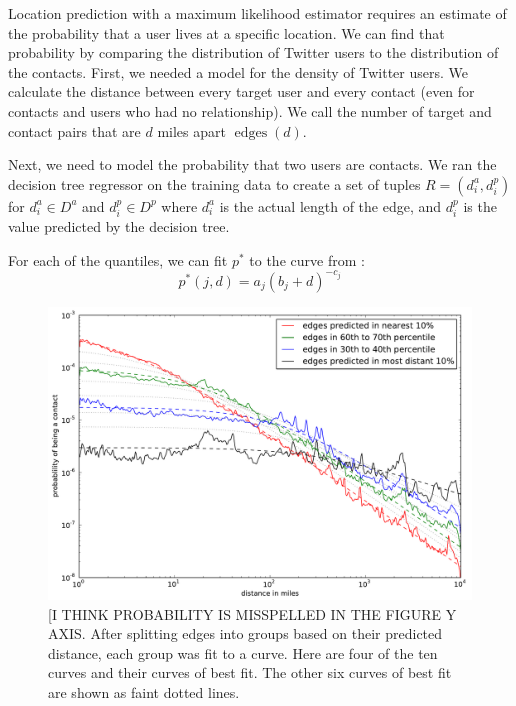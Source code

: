 \documentclass[letterpaper]{article}
\DeclareMathOperator{\edges}{edges}
\begin{document}
Location prediction with a maximum likelihood estimator requires an estimate of the probability that a user lives at a specific location. We can find that probability by comparing the distribution of Twitter users to the distribution of the contacts. First, we needed a model for the density of Twitter users. We calculate the distance between every target user and every contact (even for contacts and users who had no relationship). We call the number of target and contact pairs that are $d$ miles apart $\edges(d)$.


Next, we need to model the probability that two users are contacts. We ran the decision tree regressor on the training data to create a set of
tuples $R = (d^a_i, d^p_i)$ for $d^a_i \in D^a$ and $d^p_i \in D^p$ where $d^a_i$ is the actual length of the edge, and $d^p_i$ is the value predicted by the decision tree. 






For each of the quantiles, we can fit $p^*$ to the curve from \cite{backstrom2010find}:
\[
    p^*(j,d) = a_{j} (b_{j}+d)^{-c_{j}}
\]

\begin{figure}[tbh]
\centering
\includegraphics[width=\linewidth]{figures/near_prob_fit.pdf}
\caption{
[I THINK PROBABILITY IS MISSPELLED IN THE FIGURE Y AXIS. After splitting edges into groups based on their predicted distance, each group
was fit to a curve. Here are four of the ten curves and their curves of best
fit. The other six curves of best fit are shown as faint dotted lines.}
\label{fig:NearProbFit}
\end{figure}
\end{document}
